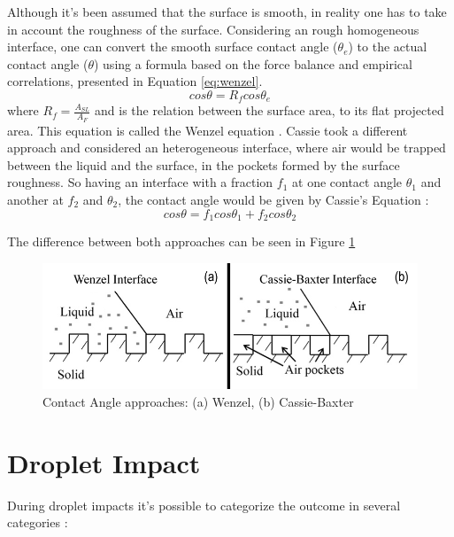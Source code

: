 \par Although it's been assumed that the surface is smooth, in reality one has to take in account the roughness of the surface. Considering an rough homogeneous interface, one can convert the smooth surface contact angle ($\theta_e$) to the actual contact angle ($\theta$) using a formula based on the force balance and empirical correlations, presented in Equation \ref{eq:wenzel}. 
\begin{equation}\label{eq:wenzel}
cos \theta = R_f cos \theta_e
\end{equation}
where $R_f= \frac{A_{SL}}{A_{F}}$ and is the relation between the surface area, to its flat projected area. This equation is called the Wenzel equation \cite{wenzel1936resistance}. Cassie took a different approach and considered an heterogeneous interface, where air would be trapped between the liquid and the surface, in the pockets formed by the surface roughness. So having an interface with a fraction $f_1$ at one contact angle $\theta_1$ and another at $f_2$ and $\theta_2$, the contact angle would be given by Cassie's Equation \cite{cassie1944wettability} :
\begin{equation}\label{eq:cassie}
cos \theta = f_1 cos \theta_1 + f_2 cos \theta_2
\end{equation}
\par The difference between both approaches can be seen in Figure \ref{fig:wenzelcassie}

\begin{figure}[h]
\centering
\includegraphics[width=0.7\linewidth]{Figures/2.Chapter/wenzelcassie.png}
\caption{Contact Angle approaches: (a) Wenzel, (b) Cassie-Baxter}
\label{fig:wenzelcassie}
\end{figure}


\section{Droplet Impact}

\par During droplet impacts it's possible to categorize the outcome in several categories :

